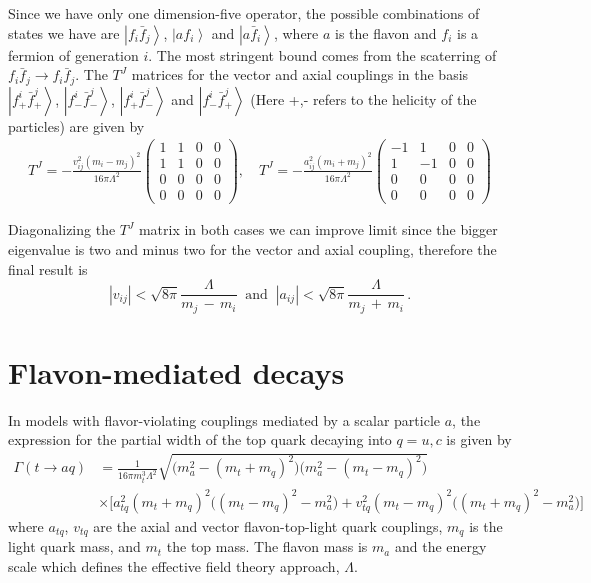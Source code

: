\documentclass[prd,amsfonts,onecolumn,superscriptaddress,aps,nofootinbib,11pt]{revtex4-1}
\begin{document}
Since we have only one dimension-five operator, the possible combinations of states we have are 
$\left|f_i \bar{f}_j\right\rangle$, $\left|a f_i\right\rangle$ and $\left|a \bar{f}_i\right\rangle$, where $a$ is the flavon and $f_i$ is a fermion of generation $i$. The most stringent bound comes from the scaterring of $f_i \bar{f}_j \rightarrow f_i \bar{f}_j$. The $T^J$ matrices for the vector and axial couplings in the basis $\left|f^i_+ \bar{f}^j_+\right\rangle$, $\left|f^i_- \bar{f}^j_-\right\rangle$, $\left|f^i_+ \bar{f}^j_-\right\rangle$ and $\left|f^i_- \bar{f}^j_+\right\rangle$ (Here +,- refers to the helicity of the particles) are given by
\begin{eqnarray}
T^J = -\frac{v_{ij}^2\left(m_i - m_j\right)^2}{16\pi\Lambda^2}
    \begin{pmatrix}
     1 & 1 & 0 & 0\\   
     1 & 1 & 0 & 0 \\
     0 & 0 & 0 & 0\\
     0 & 0 & 0 & 0
    \end{pmatrix}, \quad
T^J = -\frac{a_{ij}^2\left(m_i + m_j\right)^2}{16\pi\Lambda^2}
    \begin{pmatrix}
     -1 & 1 & 0 & 0\\   
     1 & -1 & 0 & 0 \\
     0 & 0 & 0 & 0\\
     0 & 0 & 0 & 0
    \end{pmatrix}
\end{eqnarray}

\indent Diagonalizing the $T^J$ matrix in both cases we can improve limit since the bigger eigenvalue is two and minus two for the vector and axial coupling, therefore the final result is
\begin{equation}
  \left|v_{ij} \right| < \sqrt{8\pi}\frac{\Lambda}{m_j\,-\,m_i} \;\;\mbox{and}\;\; \left|a_{ij} \right| <\sqrt{8\pi}\frac{\Lambda}{m_j\,+\,m_i}\, .
\end{equation}


\section{Flavon-mediated decays}
\label{app:decay}

In models with flavor-violating couplings mediated by a scalar particle $a$, the expression for the partial width of the top quark decaying into $q = u, c$ is given by %
\begin{equation}\label{eq:top-decay}
    \begin{split}
       \Gamma(t \to a q) &=  \frac{1}{16\pi m_t^3 \Lambda^2 } \sqrt{\Big(m_a^2 - (m_t + m_q)^2\Big) \Big(m_a^2 - (m_t - m_q)^2\Big)} \\
       &\times \Bigg[a_{tq}^2 (m_t+m_q)^2\Big((m_t - m_q)^2 - m_a^2 \Big)  + v_{tq}^2 (m_t - m_q)^2\Big((m_t + m_q)^2 - m_a^2\Big) \Bigg]
    \end{split}
\end{equation}
where $a_{tq}$, $v_{tq}$ are the axial and vector flavon-top-light quark couplings, $m_q$ is the light quark mass, and $m_t$ the top mass. The flavon mass is $m_a$ and the energy scale which defines the effective field theory approach, $\Lambda$.
\end{document}
